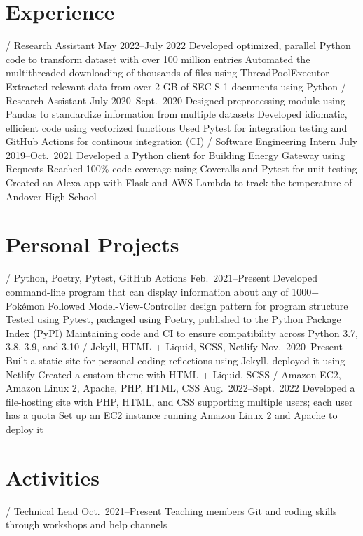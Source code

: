 \section{Experience}
\begin{doutline}
     / Research Assistant
    \hfill May 2022--July 2022
        \2 Developed optimized, parallel Python code to transform dataset with over 100 million entries
        \2 Automated the multithreaded downloading of thousands of files using ThreadPoolExecutor
        \2 Extracted relevant data from over 2 GB of SEC S-1 documents using Python
     / Research Assistant
    \hfill July 2020--Sept.\ 2020
        \2 Designed preprocessing module using Pandas to standardize information from multiple datasets
            \3 Developed idiomatic, efficient code using vectorized functions
            \3 Used Pytest for integration testing and GitHub Actions for continous integration (CI)
     / Software Engineering Intern
    \hfill July 2019--Oct.\ 2021
        \2 Developed a Python client for Building Energy Gateway using Requests
            \3 Reached 100\% code coverage using Coveralls and Pytest for unit testing
        \2 Created an Alexa app with Flask and AWS Lambda to track the temperature of Andover High School
\end{doutline}

\section{Personal Projects}
\begin{doutline}
    \1[Pokésummary] / Python, Poetry, Pytest, GitHub Actions
    \hfill Feb.\ 2021--Present
        \2 Developed command-line program that can display information about any of 1000+ Pokémon
            \3 Followed Model-View-Controller design pattern for program structure
            \3 Tested using Pytest, packaged using Poetry, published to the Python Package Index (PyPI)
        \2 Maintaining code and CI to ensure compatibility across Python 3.7, 3.8, 3.9, and 3.10
     / Jekyll, HTML + Liquid, SCSS, Netlify
    \hfill Nov.\ 2020--Present
        \2 Built a static site for personal coding reflections using Jekyll, deployed it using Netlify
            \3 Created a custom theme with HTML + Liquid, SCSS
     / Amazon EC2, Amazon Linux 2, Apache, PHP, HTML, CSS
    \hfill Aug.\ 2022--Sept.\ 2022
        \2 Developed a file-hosting site with PHP, HTML, and CSS supporting multiple users; each user has a quota
        \2 Set up an EC2 instance running Amazon Linux 2 and Apache to deploy it
\end{doutline}

\section{Activities}
\begin{doutline}
     / Technical Lead
    \hfill Oct.\ 2021--Present
        \2 Teaching members Git and coding skills through workshops and help channels
\end{doutline}
